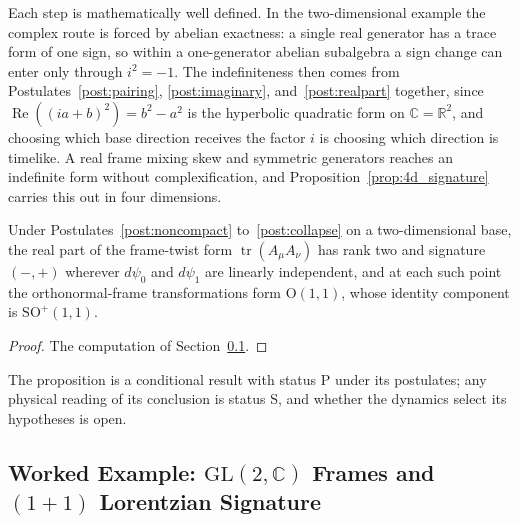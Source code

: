 Each step is mathematically well defined. In the two-dimensional example the complex route is forced by abelian exactness: a single real generator has a trace form of one sign, so within a one-generator abelian subalgebra a sign change can enter only through $i^2 = -1$. The indefiniteness then comes from Postulates~\ref{post:pairing}, \ref{post:imaginary}, and~\ref{post:realpart} together, since $\operatorname{Re}((ia+b)^2) = b^2 - a^2$ is the hyperbolic quadratic form on $\mathbb{C} = \mathbb{R}^2$, and choosing which base direction receives the factor $i$ is choosing which direction is timelike. A real frame mixing skew and symmetric generators reaches an indefinite form without complexification, and Proposition~\ref{prop:4d_signature} carries this out in four dimensions.

\begin{proposition}\label{prop:conditional_signature}
Under Postulates~\ref{post:noncompact} to~\ref{post:collapse} on a two-dimensional base, the real part of the frame-twist form $\operatorname{tr}(A_\mu A_\nu)$ has rank two and signature $(-,+)$ wherever $d\psi_0$ and $d\psi_1$ are linearly independent, and at each such point the orthonormal-frame transformations form $\mathrm{O}(1,1)$, whose identity component is $\mathrm{SO}^+(1,1)$.
\end{proposition}
\begin{proof}
The computation of Section~\ref{sec:worked_signature}.
\end{proof}
The proposition is a conditional result with status P under its postulates; any physical reading of its conclusion is status S, and whether the dynamics select its hypotheses is open.

\subsection{Worked Example: \texorpdfstring{$\mathrm{GL}(2,\mathbb{C})$}{GL(2,C)} Frames and \texorpdfstring{$(1{+}1)$}{(1+1)} Lorentzian Signature}
\label{sec:worked_signature}

